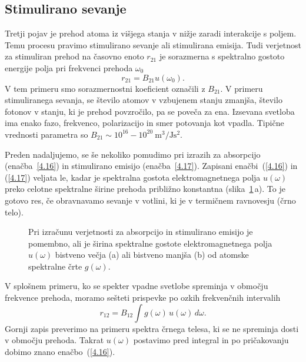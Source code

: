\subsection*{Stimulirano sevanje}
Tretji pojav je prehod atoma iz višjega stanja v nižje zaradi interakcije
s poljem. Temu procesu pravimo stimulirano sevanje ali 
stimulirana emisija. Tudi verjetnost za stimuliran prehod na časovno enoto $r_{21}$ 
je sorazmerna s spektralno gostoto energije polja pri frekvenci prehoda $\omega_{0}$
\begin{equation}
r_{21}=B_{21}u(\omega_{0}).
\label{4.17}
\end{equation}
V tem primeru smo sorazmernostni koeficient označili z $B_{21}$. V primeru
stimuliranega sevanja, se število atomov v vzbujenem stanju zmanjša, 
število fotonov v stanju, ki je prehod povzročilo, pa se poveča za ena. 
Izsevana svetloba ima enako fazo, frekvenco, polarizacijo in smer potovanja kot 
vpadla. Tipične vrednosti parametra so $B_{21} \sim 10^{16}-10^{20}~\si{\metre^3/\joule\second^2}	$.

Preden nadaljujemo, se še nekoliko pomudimo pri izrazih za absorpcijo
(enačba~\ref{4.16}) in stimulirano emisijo (enačba~\ref{4.17}).
Zapisani enačbi~(\ref{4.16}) in (\ref{4.17})
veljata le, kadar je spektralna gostota elektromagnetnega polja $u(\omega)$
preko celotne spektralne širine prehoda približno konstantna 
(slika~\ref{fig:spektri}\,a). To je gotovo res, če
obravnavamo sevanje v votlini, ki je v termičnem ravnovesju (črno telo). 

\begin{figure}
\centering
\def\svgwidth{120truemm} 

\caption{Pri izračunu verjetnosti za absorpcijo in stimulirano emisijo je pomembno, ali je 
širina spektralne gostote elektromagnetnega polja $u(\omega)$ bistveno večja (a) ali bistveno manjša (b)
od atomske spektralne črte $g(\omega)$.}
\label{fig:spektri}
\end{figure}

V splošnem primeru, ko se spekter vpadne svetlobe spreminja v območju 
frekvence prehoda, moramo sešteti prispevke po ozkih frekvenčnih intervalih
\begin{equation}
r_{12}=B_{12}\int g(\omega)\, u(\omega)\, d\omega.
\label{4.19}
\end{equation}
Gornji zapis preverimo na primeru spektra črnega telesa, ki se ne spreminja 
dosti v območju prehoda. Takrat $u(\omega)$ postavimo pred integral in po pričakovanju
dobimo znano enačbo~(\ref{4.16}). 

